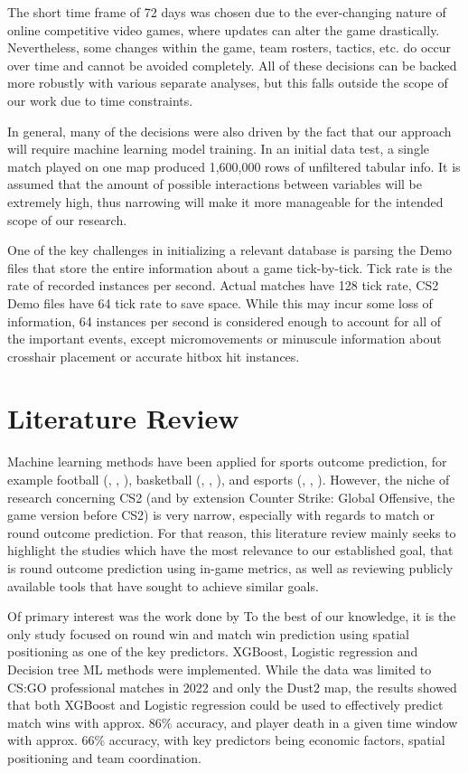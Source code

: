 \documentclass[twoside,11pt]{article}
\begin{document}
The short time frame of 72 days was chosen due to the ever-changing nature of online competitive
video games, where updates can alter the game drastically. Nevertheless, some changes within the
game, team rosters, tactics, etc. do occur over time and cannot be avoided completely. All of these
decisions can be backed more robustly with various separate analyses, but this falls outside the
scope of our work due to time constraints.

In general, many of the decisions were also driven by the fact that our approach will require
machine learning model training. In an initial data test, a single match played on one map produced
1,600,000 rows of unfiltered tabular info. It is assumed that the amount of possible interactions
between variables will be extremely high, thus narrowing will make it more manageable for the
intended scope of our research.

One of the key challenges in initializing a relevant database is parsing the Demo files that store
the entire information about a game tick-by-tick. Tick rate is the rate of recorded instances per
second. Actual matches have 128 tick rate, CS2 Demo files have 64 tick rate to save space. While
this may incur some loss of information, 64 instances per second is considered enough to account for
all of the important events, except micromovements or minuscule information about crosshair
placement or accurate hitbox hit instances.

\section{Literature Review}

Machine learning methods have been applied for sports outcome prediction, for example football
(\cite{moya-2025football}, \cite{berrar-2024football}, \cite{mills-2024football}), basketball
(\cite{chen2021nba}, \cite{ouyang2024nba}, \cite{alves-2025nba}), and esports
(\cite{stanlly2022dota}, \cite{makarov-2017dota}, \cite{shen2022lol}). However, the niche of
research concerning CS2 (and by extension Counter Strike: Global Offensive, the game version before
CS2) is very narrow, especially with regards to match or round outcome prediction. For that reason,
this literature review mainly seeks to highlight the studies which have the most relevance to our
established goal, that is round outcome prediction using in-game metrics, as well as reviewing
publicly available tools that have sought to achieve similar goals.

Of primary interest was the work done by \cite{xia2025_cs} To the best of our knowledge, it is the
only study focused on round win and match win prediction using spatial positioning as one of the key
predictors. XGBoost, Logistic regression and Decision tree ML methods were implemented. While the
data was limited to CS:GO professional matches in 2022 and only the Dust2 map, the results showed
that both XGBoost and Logistic regression could be used to effectively predict match wins with
approx. 86\% accuracy, and player death in a given time window with approx. 66\% accuracy, with key
predictors being economic factors, spatial positioning and team coordination.
\end{document}
